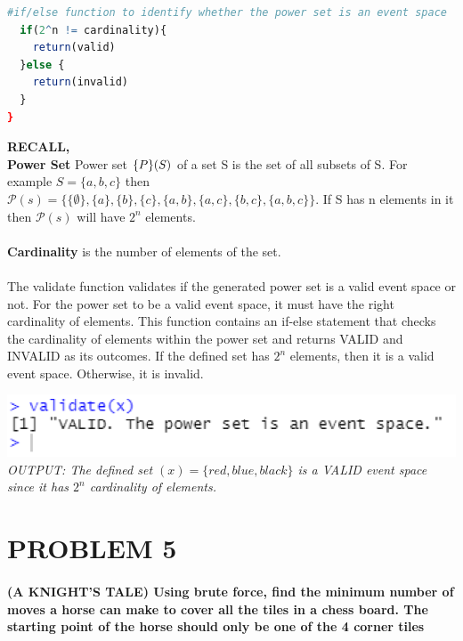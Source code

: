 \documentclass[12pt,letterpaper]{article}
\begin{document}
\begin{enumerate}[label=\Alph*]
\begin{lstlisting}[language=R]
  #if/else function to identify whether the power set is an event space
  if(2^n != cardinality){
    return(valid)
  }else {
    return(invalid)
  }
}
\end{lstlisting}

\textbf{RECALL,}\\
\textbf{Power Set} Power set $\mathcal\{P\}(S)$ of a set S is the set of all subsets of S. For example $S = \{a, b, c\}$ then $\mathcal{P}(s) = \{\{\emptyset\}, \{a\}, \{b\}, \{c\}, \{a, b\}, \{a, c\}, \{b, c\}, \{a, b, c\}\}$. If S has n elements in it then $\mathcal{P}(s)$ will have $2^n$ elements.\\\\
\textbf{Cardinality} is the number of elements of the set.\\\\
The validate function validates if the generated power set is a valid event space or not. For the power set to be a valid event space, it must have the right cardinality of elements. This function contains an if-else statement that checks the cardinality of elements within the power set and returns VALID and INVALID as its outcomes. If the defined set has $2^n$ elements, then it is a valid event space. Otherwise, it is invalid.

\begin{center}
\includegraphics[scale=0.4]{fig4.2}\\
\textit{\footnotesize OUTPUT: The defined set $(x)= \{red, blue, black\}$ is a VALID event space since it has $2^n$ cardinality of elements.}
\end{center}  
\end{enumerate}


\pagebreak

\section*{PROBLEM 5}

\paragraph{(A KNIGHT'S TALE) Using brute force, find the minimum number of moves a horse can make to cover all the tiles in a chess board. The starting point of the horse should only be one of the 4 corner tiles}
\end{document}

